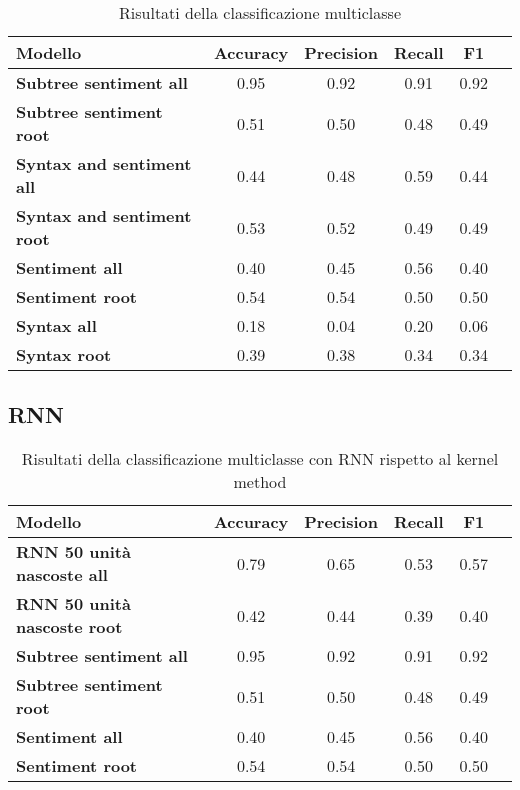 \begin{table}[H]
    \centering
    \begin{tabular}{|l|c|c|c|c|c|}
    \hline
    \textbf{Modello} & \textbf{Accuracy} & \textbf{Precision} & \textbf{Recall} & \textbf{F1} \\
    \hline
    \textbf{Subtree sentiment all} & 0.95 & 0.92 & 0.91 & 0.92 \\
    \textbf{Subtree sentiment root} & 0.51 & 0.50 & 0.48 & 0.49 \\
    \hline

    \textbf{Syntax and sentiment all} & 0.44 & 0.48 & 0.59 & 0.44 \\
    \textbf{Syntax and sentiment root} & 0.53 & 0.52 & 0.49 & 0.49 \\
    \hline

    \textbf{Sentiment all} & 0.40 & 0.45 & 0.56 & 0.40 \\
    \textbf{Sentiment root} & 0.54 & 0.54 & 0.50 & 0.50 \\
    \hline

    \textbf{Syntax all} & 0.18 & 0.04 & 0.20 & 0.06 \\
    \textbf{Syntax root} & 0.39 & 0.38 & 0.34 & 0.34 \\
    \hline
    \end{tabular}
    \caption{Risultati della classificazione multiclasse}
\end{table}

\subsection{RNN}

\begin{table}[H]
    \centering
    \begin{tabular}{|l|c|c|c|c|c|}
    \hline
    \textbf{Modello} & \textbf{Accuracy} & \textbf{Precision} & \textbf{Recall} & \textbf{F1} \\
    \hline
    \textbf{RNN 50 unità nascoste all} & 0.79 & 0.65 & 0.53 & 0.57 \\
    \textbf{RNN 50 unità nascoste root} & 0.42 & 0.44 & 0.39 & 0.40 \\
    \hline

    \textbf{Subtree sentiment all} & 0.95 & 0.92 & 0.91 & 0.92 \\
    \textbf{Subtree sentiment root} & 0.51 & 0.50 & 0.48 & 0.49 \\
    \hline

    \textbf{Sentiment all} & 0.40 & 0.45 & 0.56 & 0.40 \\
    \textbf{Sentiment root} & 0.54 & 0.54 & 0.50 & 0.50 \\
    \hline
    \end{tabular}
    \caption{Risultati della classificazione multiclasse con RNN rispetto al
    kernel method}
\end{table}
 
